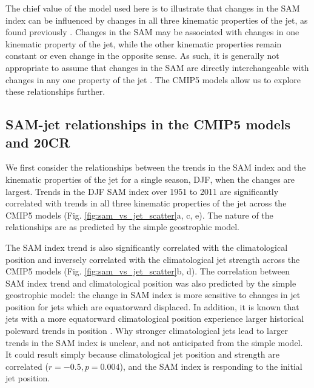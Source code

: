 \documentclass{ametsoc}
\begin{document}
The chief value of the model used here is to illustrate that changes in the SAM index can be
influenced by changes in all three kinematic properties of the jet, as found previously 
\citep{Monahan_and_Fyfe_2006, Monahan_and_Fyfe_2008}. Changes in the SAM may be associated 
with changes in one kinematic property of the jet, while the other kinematic properties 
remain constant or even change in the opposite sense. As such, it is generally not appropriate to assume that changes 
in the SAM are directly interchangeable with changes in any one 
property of the jet \citep{Monahan_and_Fyfe_2006, Monahan_and_Fyfe_2008}. 
The CMIP5 models allow us to explore these relationships further.

\subsection{SAM-jet relationships in the CMIP5 models and 20CR}
We first consider the relationships between the trends in the SAM index and the kinematic
properties of the jet for a single season, DJF, when the changes are largest. Trends 
in the DJF SAM index over 1951 to 2011 are significantly correlated with 
trends in all three kinematic properties of the jet across 
the CMIP5 models (Fig. \ref{fig:sam_vs_jet_scatter}a, c, e). The nature of the relationships 
are as predicted by the simple geostrophic model. 

The SAM index trend is also significantly correlated with the climatological 
position and inversely correlated with the climatological jet strength across the CMIP5 models 
(Fig. \ref{fig:sam_vs_jet_scatter}b, d). The correlation between
SAM index trend and climatological position was also predicted by the simple geostrophic model: 
the change in SAM index is more sensitive to changes in jet position for jets which are 
equatorward displaced. In addition, it is known that jets with a more equatorward 
climatological position experience larger historical poleward trends in position 
\citep{Kidston_and_Gerber_2010, Bracegirdle_et_al_2013}. Why stronger climatological jets 
lead to larger trends in the SAM index is unclear, and not anticipated from the simple model. 
It could result simply because climatological jet position and strength are correlated 
($r=-0.5, p=0.004$), and the SAM index is responding to the initial jet position.
\end{document}
